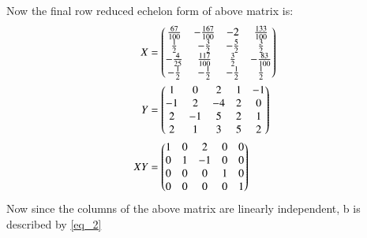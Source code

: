 \documentclass[journal,12pt,twocolumn]{IEEEtran}
\begin{document}
Now the final row reduced echelon form of above matrix is:
\begin{align}
    X &= \begin{pmatrix}\frac{67}{100}&-\frac{167}{100}&-2&\frac{133}{100}\\
           \frac{1}{2}&-\frac{3}{2}&-\frac{5}{2}&\frac{3}{2}\\
           -\frac{4}{25}&\frac{117}{100}&\frac{3}{2}&-\frac{83}{100}\\
           -\frac{1}{2}&-\frac{1}{2}&-\frac{1}{2}&\frac{1}{2}\end{pmatrix} \\
    Y &= \begin{pmatrix}1 & 0 & 2 & 1 & -1 \\
           -1 & 2 & -4 & 2 & 0 \\
           2 & -1 & 5 & 2 & 1 \\
           2 & 1 & 3 & 5 & 2\end{pmatrix} \\ 
   XY &= \begin{pmatrix}1 & 0 & 2 & 0 & 0 \\
           0 & 1 & -1 & 0 & 0 \\
           0 & 0 & 0 & 1 & 0 \\
           0 & 0 & 0 & 0 & 1\end{pmatrix}
\end{align}
Now since the columns of the above matrix are linearly independent, b is described by \eqref{eq_2}
\end{document}
